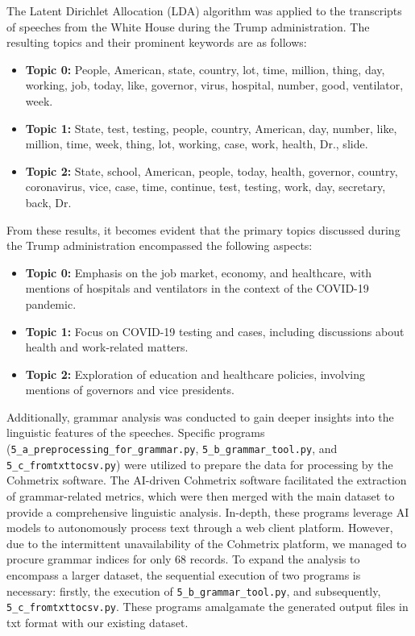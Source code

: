 \documentclass{article}
\begin{document}
The Latent Dirichlet Allocation (LDA) algorithm was applied to the transcripts of speeches from the White House during the Trump administration. The resulting topics and their prominent keywords are as follows:

\begin{itemize}
    \item \textbf{Topic 0:} People, American, state, country, lot, time, million, thing, day, working, job, today, like, governor, virus, hospital, number, good, ventilator, week.
    
    \item \textbf{Topic 1:} State, test, testing, people, country, American, day, number, like, million, time, week, thing, lot, working, case, work, health, Dr., slide.
    
    \item \textbf{Topic 2:} State, school, American, people, today, health, governor, country, coronavirus, vice, case, time, continue, test, testing, work, day, secretary, back, Dr.
\end{itemize}

From these results, it becomes evident that the primary topics discussed during the Trump administration encompassed the following aspects:

\begin{itemize}
    \item \textbf{Topic 0:} Emphasis on the job market, economy, and healthcare, with mentions of hospitals and ventilators in the context of the COVID-19 pandemic.
    
    \item \textbf{Topic 1:} Focus on COVID-19 testing and cases, including discussions about health and work-related matters.
    
    \item \textbf{Topic 2:} Exploration of education and healthcare policies, involving mentions of governors and vice presidents.
\end{itemize}

\par

Additionally, grammar analysis was conducted to gain deeper insights into the linguistic features of the speeches. \newline Specific programs (\texttt{5\_a\_preprocessing\_for\_grammar.py}, \texttt{5\_b\_grammar\_tool.py}, and \texttt{5\_c\_fromtxttocsv.py}) were utilized to prepare the data for processing by the Cohmetrix software. 
The AI-driven Cohmetrix software facilitated the extraction of grammar-related metrics, which were then merged with the main dataset to provide a comprehensive linguistic analysis.
In-depth, these programs leverage AI models to autonomously process text through a web client platform. However, due to the intermittent unavailability of the Cohmetrix platform, we managed to procure grammar indices for only 68 records. To expand the analysis to encompass a larger dataset, the sequential execution of two programs is necessary: firstly, the execution of \texttt{5\_b\_grammar\_tool.py}, and subsequently, \texttt{5\_c\_fromtxttocsv.py}. These programs amalgamate the generated output files in txt format with our existing dataset.
\end{document}

